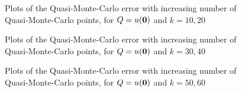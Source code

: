 \begin{figure}[h]
    \centering
  \begin{subfigure}{0.45\textwidth}

  \end{subfigure}
    \begin{subfigure}{0.45\textwidth}

    \end{subfigure}
\caption{Plots of the Quasi-Monte-Carlo error with increasing number of Quasi-Monte-Carlo points, for $Q=u(\mathbf{0})$ and $k=10,20$ \label{fig:qmcorigin1020}}
\end{figure}
\begin{figure}[h]
    \centering
  \begin{subfigure}{0.45\textwidth}

  \end{subfigure}
    \begin{subfigure}{0.45\textwidth}

    \end{subfigure}
\caption{Plots of the Quasi-Monte-Carlo error with increasing number of Quasi-Monte-Carlo points, for $Q=u(\mathbf{0})$ and $k=30,40$ \label{fig:qmcorigin3040}}
\end{figure}
\begin{figure}[h]
    \centering
  \begin{subfigure}{0.45\textwidth}

  \end{subfigure}
    \begin{subfigure}{0.45\textwidth}

    \end{subfigure}
\caption{Plots of the Quasi-Monte-Carlo error with increasing number of Quasi-Monte-Carlo points, for $Q=u(\mathbf{0})$ and $k=50,60$ \label{fig:qmcorigin5060}}
\end{figure}

